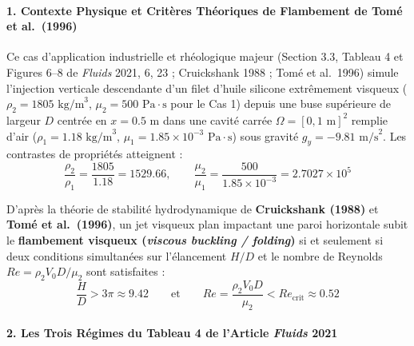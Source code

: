 \documentclass[
  10pt,
]{article}
\begin{document}
\paragraph{1. Contexte Physique et Critères Théoriques de Flambement de
Tomé et
al.~(1996)}\label{contexte-physique-et-crituxe8res-thuxe9oriques-de-flambement-de-tomuxe9-et-al.-1996}

Ce cas d'application industrielle et rhéologique majeur (Section 3.3,
Tableau 4 et Figures 6--8 de \emph{Fluids} 2021, 6, 23 ; Cruickshank
1988 ; Tomé et al.~1996) simule l'injection verticale descendante d'un
filet d'huile silicone extrêmement visqueux
(\(\rho_2 = 1805\text{ kg/m}^3\), \(\mu_2 = 500\text{ Pa}\cdot\text{s}\)
pour le Cas 1) depuis une buse supérieure de largeur \(D\) centrée en
\(x = 0.5\text{ m}\) dans une cavité carrée
\(\Omega = [0, 1\text{ m}]^2\) remplie d'air
(\(\rho_1 = 1.18\text{ kg/m}^3\),
\(\mu_1 = 1.85 \times 10^{-3}\text{ Pa}\cdot\text{s}\)) sous gravité
\(g_y = -9.81\text{ m/s}^2\). Les contrastes de propriétés atteignent :
\[\frac{\rho_2}{\rho_1} = \frac{1805}{1.18} = 1529.66, \qquad \frac{\mu_2}{\mu_1} = \frac{500}{1.85 \times 10^{-3}} = 2.7027 \times 10^5\]

D'après la théorie de stabilité hydrodynamique de \textbf{Cruickshank
(1988)} et \textbf{Tomé et al.~(1996)}, un jet visqueux plan impactant
une paroi horizontale subit le \textbf{flambement visqueux
(\emph{viscous buckling / folding})} si et seulement si deux conditions
simultanées sur l'élancement \(H/D\) et le nombre de Reynolds
\(Re = \rho_2 V_0 D / \mu_2\) sont satisfaites :
\[\frac{H}{D} > 3\pi \approx 9.42 \qquad \text{et} \qquad Re = \frac{\rho_2 V_0 D}{\mu_2} < Re_{\text{crit}} \approx 0.52\]

\paragraph{\texorpdfstring{2. Les Trois Régimes du Tableau 4 de
l'Article \emph{Fluids}
2021}{2. Les Trois Régimes du Tableau 4 de l'Article Fluids 2021}}\label{les-trois-ruxe9gimes-du-tableau-4-de-larticle-fluids-2021}
\end{document}
